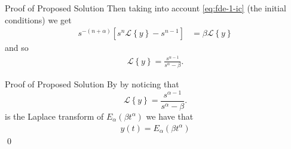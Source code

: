 \documentclass[pdf]{beamer}
\newcommand{\laplace}[1]{ \mathcal{L} \left\{ #1 \right\} }
\begin{document}
\begin{frame}{Proof of Proposed Solution}
	Then taking into account \eqref{eq:fde-1-ic} (the initial conditions) we get
	\begin{align*}
		s^{-(n+\alpha)} \left[s^n \laplace{y} - s^{n-1}\right] &= \beta \laplace{y}
	\end{align*}
	and so 
	\begin{align*}
		\laplace{y} = \frac{s^{\alpha-1}}{s^\alpha - \beta}.
	\end{align*}
\end{frame}

\begin{frame}{Proof of Proposed Solution}
	By by noticing that 
	$$
		\laplace{y} = \frac{s^{\alpha-1}}{s^\alpha - \beta}.
	$$
	is the Laplace transform of $ E_\alpha(\beta t^\alpha) $ we have that
	\begin{align*}
		y(t) = E_\alpha(\beta t^\alpha)
	\end{align*}
	\qed
\end{frame}


	
\end{document}
